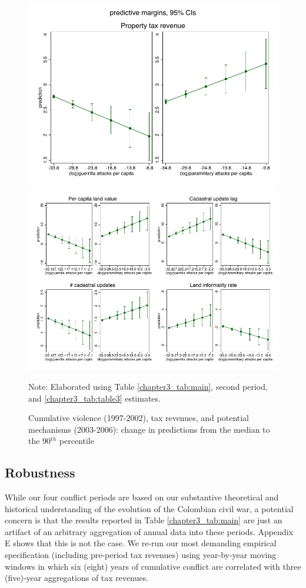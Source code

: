 \begin{figure}[H]
\begin{center}
\caption{Cumulative violence (1997-2002), tax revenues, and potential mechanisms (2003-2006): change in predictions from the median to the 90$^{th}$ percentile}
\label{chapter3_fig:margins}
\includegraphics[width=.75\textwidth]{Chapter3/Figures/figure6_part1.pdf}
\includegraphics[width=1\textwidth]{Chapter3/Figures/figure6_part2.pdf}
\end{center}
Note: Elaborated using Table \ref{chapter3_tab:main}, second period, and \ref{chapter3_tab:table3} estimates.
\end{figure}

\subsection{Robustness}

While our four conflict periods are based on our substantive theoretical and historical understanding of the evolution of the Colombian civil war, a potential concern is that the results reported in Table \ref{chapter3_tab:main} are just an artifact of an arbitrary aggregation of annual data into these periods. Appendix E shows that this is not the case. We re-run our most demanding empirical specification (including pre-period tax revenues) using year-by-year moving windows in which six (eight) years of cumulative conflict are correlated with three (five)-year aggregations of tax revenues.

